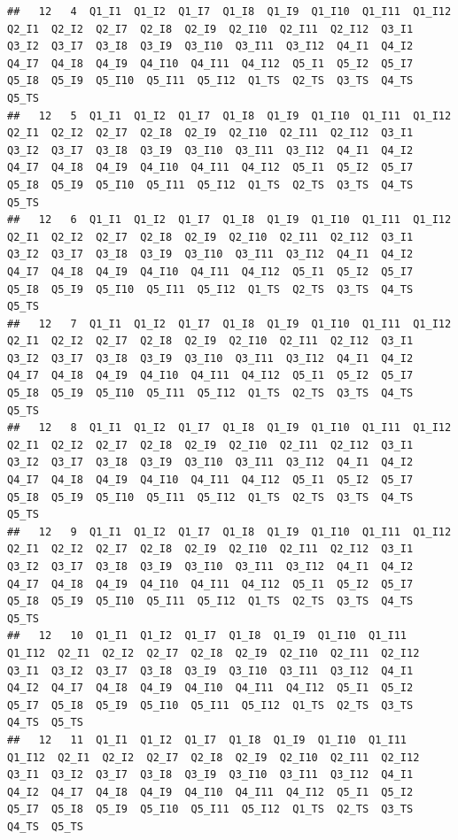 \documentclass[
]{book}
\begin{document}
\begin{verbatim}
##   12   4  Q1_I1  Q1_I2  Q1_I7  Q1_I8  Q1_I9  Q1_I10  Q1_I11  Q1_I12  Q2_I1  Q2_I2  Q2_I7  Q2_I8  Q2_I9  Q2_I10  Q2_I11  Q2_I12  Q3_I1  Q3_I2  Q3_I7  Q3_I8  Q3_I9  Q3_I10  Q3_I11  Q3_I12  Q4_I1  Q4_I2  Q4_I7  Q4_I8  Q4_I9  Q4_I10  Q4_I11  Q4_I12  Q5_I1  Q5_I2  Q5_I7  Q5_I8  Q5_I9  Q5_I10  Q5_I11  Q5_I12  Q1_TS  Q2_TS  Q3_TS  Q4_TS  Q5_TS
##   12   5  Q1_I1  Q1_I2  Q1_I7  Q1_I8  Q1_I9  Q1_I10  Q1_I11  Q1_I12  Q2_I1  Q2_I2  Q2_I7  Q2_I8  Q2_I9  Q2_I10  Q2_I11  Q2_I12  Q3_I1  Q3_I2  Q3_I7  Q3_I8  Q3_I9  Q3_I10  Q3_I11  Q3_I12  Q4_I1  Q4_I2  Q4_I7  Q4_I8  Q4_I9  Q4_I10  Q4_I11  Q4_I12  Q5_I1  Q5_I2  Q5_I7  Q5_I8  Q5_I9  Q5_I10  Q5_I11  Q5_I12  Q1_TS  Q2_TS  Q3_TS  Q4_TS  Q5_TS
##   12   6  Q1_I1  Q1_I2  Q1_I7  Q1_I8  Q1_I9  Q1_I10  Q1_I11  Q1_I12  Q2_I1  Q2_I2  Q2_I7  Q2_I8  Q2_I9  Q2_I10  Q2_I11  Q2_I12  Q3_I1  Q3_I2  Q3_I7  Q3_I8  Q3_I9  Q3_I10  Q3_I11  Q3_I12  Q4_I1  Q4_I2  Q4_I7  Q4_I8  Q4_I9  Q4_I10  Q4_I11  Q4_I12  Q5_I1  Q5_I2  Q5_I7  Q5_I8  Q5_I9  Q5_I10  Q5_I11  Q5_I12  Q1_TS  Q2_TS  Q3_TS  Q4_TS  Q5_TS
##   12   7  Q1_I1  Q1_I2  Q1_I7  Q1_I8  Q1_I9  Q1_I10  Q1_I11  Q1_I12  Q2_I1  Q2_I2  Q2_I7  Q2_I8  Q2_I9  Q2_I10  Q2_I11  Q2_I12  Q3_I1  Q3_I2  Q3_I7  Q3_I8  Q3_I9  Q3_I10  Q3_I11  Q3_I12  Q4_I1  Q4_I2  Q4_I7  Q4_I8  Q4_I9  Q4_I10  Q4_I11  Q4_I12  Q5_I1  Q5_I2  Q5_I7  Q5_I8  Q5_I9  Q5_I10  Q5_I11  Q5_I12  Q1_TS  Q2_TS  Q3_TS  Q4_TS  Q5_TS
##   12   8  Q1_I1  Q1_I2  Q1_I7  Q1_I8  Q1_I9  Q1_I10  Q1_I11  Q1_I12  Q2_I1  Q2_I2  Q2_I7  Q2_I8  Q2_I9  Q2_I10  Q2_I11  Q2_I12  Q3_I1  Q3_I2  Q3_I7  Q3_I8  Q3_I9  Q3_I10  Q3_I11  Q3_I12  Q4_I1  Q4_I2  Q4_I7  Q4_I8  Q4_I9  Q4_I10  Q4_I11  Q4_I12  Q5_I1  Q5_I2  Q5_I7  Q5_I8  Q5_I9  Q5_I10  Q5_I11  Q5_I12  Q1_TS  Q2_TS  Q3_TS  Q4_TS  Q5_TS
##   12   9  Q1_I1  Q1_I2  Q1_I7  Q1_I8  Q1_I9  Q1_I10  Q1_I11  Q1_I12  Q2_I1  Q2_I2  Q2_I7  Q2_I8  Q2_I9  Q2_I10  Q2_I11  Q2_I12  Q3_I1  Q3_I2  Q3_I7  Q3_I8  Q3_I9  Q3_I10  Q3_I11  Q3_I12  Q4_I1  Q4_I2  Q4_I7  Q4_I8  Q4_I9  Q4_I10  Q4_I11  Q4_I12  Q5_I1  Q5_I2  Q5_I7  Q5_I8  Q5_I9  Q5_I10  Q5_I11  Q5_I12  Q1_TS  Q2_TS  Q3_TS  Q4_TS  Q5_TS
##   12   10  Q1_I1  Q1_I2  Q1_I7  Q1_I8  Q1_I9  Q1_I10  Q1_I11  Q1_I12  Q2_I1  Q2_I2  Q2_I7  Q2_I8  Q2_I9  Q2_I10  Q2_I11  Q2_I12  Q3_I1  Q3_I2  Q3_I7  Q3_I8  Q3_I9  Q3_I10  Q3_I11  Q3_I12  Q4_I1  Q4_I2  Q4_I7  Q4_I8  Q4_I9  Q4_I10  Q4_I11  Q4_I12  Q5_I1  Q5_I2  Q5_I7  Q5_I8  Q5_I9  Q5_I10  Q5_I11  Q5_I12  Q1_TS  Q2_TS  Q3_TS  Q4_TS  Q5_TS
##   12   11  Q1_I1  Q1_I2  Q1_I7  Q1_I8  Q1_I9  Q1_I10  Q1_I11  Q1_I12  Q2_I1  Q2_I2  Q2_I7  Q2_I8  Q2_I9  Q2_I10  Q2_I11  Q2_I12  Q3_I1  Q3_I2  Q3_I7  Q3_I8  Q3_I9  Q3_I10  Q3_I11  Q3_I12  Q4_I1  Q4_I2  Q4_I7  Q4_I8  Q4_I9  Q4_I10  Q4_I11  Q4_I12  Q5_I1  Q5_I2  Q5_I7  Q5_I8  Q5_I9  Q5_I10  Q5_I11  Q5_I12  Q1_TS  Q2_TS  Q3_TS  Q4_TS  Q5_TS

\end{verbatim}
\end{document}
